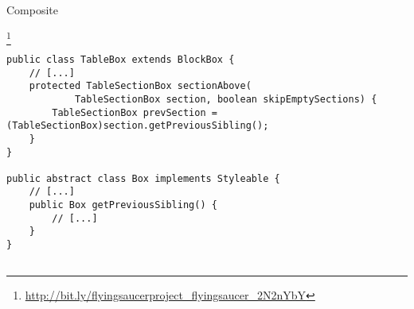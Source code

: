 \begin{pattern}{Composite}
    
\instances{}

\footnote{\url{http://bit.ly/flyingsaucerproject_flyingsaucer_2N2nYbY}}

\begin{verbatim}
public class TableBox extends BlockBox {
    // [...]
    protected TableSectionBox sectionAbove(
            TableSectionBox section, boolean skipEmptySections) {
        TableSectionBox prevSection = (TableSectionBox)section.getPreviousSibling();
    }
}

public abstract class Box implements Styleable {
    // [...]
    public Box getPreviousSibling() {
        // [...]
    }
}


\end{verbatim}

\detection{}

\discussion{}

\related{}

\end{pattern}
